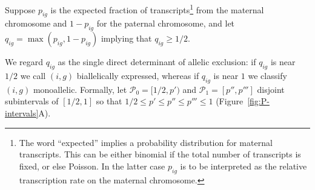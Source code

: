 \documentclass[letterpaper]{article}
\begin{document}
Suppose \(p_{ig}\) is the expected fraction of transcripts\footnote{The word
``expected'' implies a probability distribution for maternal transcripts.
This can be either binomial if the total number of transcripts is fixed, or
else Poisson.  In the latter case \(p_{ig}\) is to be interpreted as the
relative transcription rate on the maternal chromosome. } from the maternal
chromosome and \(1-p_{ig}\) for the paternal chromosome, and let
\(q_{ig}=\max(p_{ig},1-p_{ig})\) implying that \(q_{ig}\ge 1/2\).

We regard \(q_{ig}\) as the single direct determinant of
allelic exclusion: if \(q_{ig}\) is near \(1/2\) we call \((i,g)\)
biallelically expressed, whereas if \(q_{ig}\) is near \(1\) we classify
\((i,g)\) monoallelic.  Formally, let \(\mathcal{P}_0 = [1/2, p')\) and
\(\mathcal{P}_1 = [p'', p''']\) disjoint subintervals of \([1/2,1]\) so that
\(1/2\le p'\le p''\le p'''\le 1\) (Figure~\ref{fig:P-intervals}A).
\end{document}
